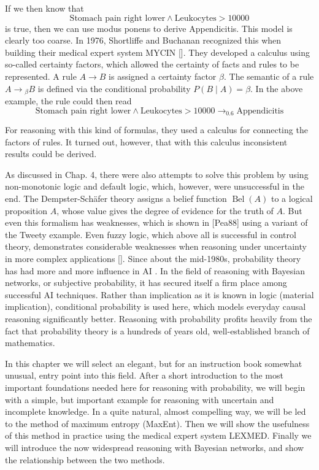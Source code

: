 \documentclass[10pt]{book}
\begin{document}
If we then know that
$$
\text{Stomach pain right lower} \wedge \text{Leukocytes} > 10000
$$
is true, then we can use modus ponens to derive Appendicitis. This model is clearly too coarse. In 1976, Shortliffe and Buchanan recognized this when building their medical expert system MYCIN [\cite{shortliffe1976mycin}]. They developed a calculus using so-called certainty factors, which allowed the certainty of facts and rules to be represented. A rule $A \rightarrow B$ is assigned a certainty factor $\beta$. The semantic of a rule $A \rightarrow{ }_{\beta} B$ is defined via the conditional probability $P(B \mid A)=\beta$. In the above example, the rule could then read
$$
\text{Stomach pain right lower} \wedge \text{Leukocytes} > 10000 \rightarrow_{0.6} \text{Appendicitis}
$$

For reasoning with this kind of formulas, they used a calculus for connecting the factors of rules. It turned out, however, that with this calculus inconsistent results could be derived.

As discussed in Chap. 4, there were also attempts to solve this problem by using non-monotonic logic and default logic, which, however, were unsuccessful in the end. The Dempster-Schäfer theory assigns a belief function $\operatorname{Bel}(A)$ to a logical proposition $A$, whose value gives the degree of evidence for the truth of $A$. But even this formalism has weaknesses, which is shown in [Pea88] using a variant of the Tweety example. Even fuzzy logic, which above all is successful in control theory, demonstrates considerable weaknesses when reasoning under uncertainty in more complex applications [\cite{elkan1993paradoxical}].
Since about the mid-1980s, probability theory has had more and more influence in AI \cite{Pea88, Che85, whittaker1996graphical, jensen2001bayesian}. In the field of reasoning with Bayesian networks, or subjective probability, it has secured itself a firm place among successful AI techniques. Rather than implication as it is known in logic (material implication), conditional probability is used here, which models everyday causal reasoning significantly better. Reasoning with probability profits heavily from the fact that probability theory is a hundreds of years old, well-established branch of mathematics.

In this chapter we will select an elegant, but for an instruction book somewhat unusual, entry point into this field. After a short introduction to the most important foundations needed here for reasoning with probability, we will begin with a simple, but important example for reasoning with uncertain and incomplete knowledge. In a quite natural, almost compelling way, we will be led to the method of maximum entropy (MaxEnt). Then we will show the usefulness of this method in practice using the medical expert system LEXMED. Finally we will introduce the now widespread reasoning with Bayesian networks, and show the relationship between the two methods.
\end{document}
